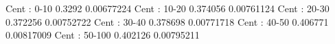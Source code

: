 Cent : 0-10
0.3292 0.00677224
Cent : 10-20
0.374056 0.00761124
Cent : 20-30
0.372256 0.00752722
Cent : 30-40
0.378698 0.00771718
Cent : 40-50
0.406771 0.00817009
Cent : 50-100
0.402126 0.00795211
